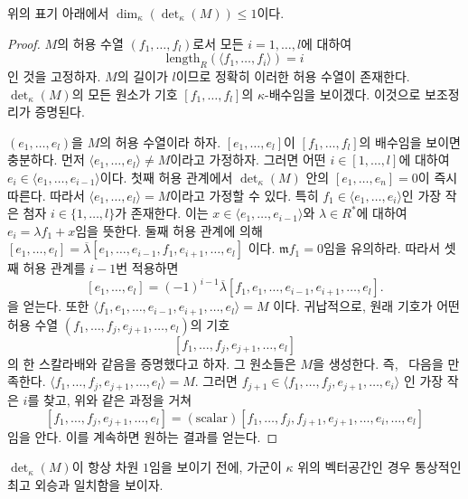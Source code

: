 \begin{lemma}
\label{lemma-dimension-at-most-one}
위의 표기 아래에서 $\dim_\kappa(\det_\kappa(M)) \leq 1$이다.
\end{lemma}

\begin{proof}
$M$의 허용 수열 $(f_1, \ldots, f_l)$로서 모든
$i = 1, \ldots, l$에 대하여
$$
\text{length}_R(\langle f_1, \ldots, f_i\rangle) = i
$$
인 것을 고정하자. $M$의 길이가 $l$이므로 정확히 이러한 허용 수열이
존재한다. $\det_\kappa(M)$의 모든 원소가 기호
$[f_1, \ldots, f_l]$의 $\kappa$-배수임을 보이겠다. 이것으로
보조정리가 증명된다.

\medskip\noindent
$(e_1, \ldots, e_l)$을 $M$의 허용 수열이라 하자.
$[e_1, \ldots, e_l]$이 $[f_1, \ldots, f_l]$의 배수임을 보이면
충분하다. 먼저
$\langle e_1, \ldots, e_l\rangle \not = M$이라고 가정하자.
그러면 어떤 $i \in [1, \ldots, l]$에 대하여
$e_i \in \langle e_1, \ldots, e_{i - 1}\rangle$이다. 첫째 허용
관계에서 $\det_\kappa(M)$ 안의
$[e_1, \ldots, e_n] = 0$이 즉시 따른다. 따라서
$\langle e_1, \ldots, e_l\rangle = M$이라고 가정할 수 있다.
특히 $f_1 \in \langle e_1, \ldots, e_i\rangle$인 가장 작은 첨자
$i \in \{1, \ldots, l\}$가 존재한다. 이는
$x \in \langle e_1, \ldots, e_{i - 1}\rangle$와
$\lambda \in R^*$에 대하여 $e_i = \lambda f_1 + x$임을 뜻한다.
둘째 허용 관계에 의해
$[e_1, \ldots, e_l] =
\overline{\lambda}[e_1, \ldots, e_{i - 1}, f_1, e_{i + 1}, \ldots, e_l]$
이다. $\mathfrak m f_1 = 0$임을 유의하라. 따라서 셋째 허용 관계를
$i - 1$번 적용하면
$$
[e_1, \ldots, e_l] =
(-1)^{i - 1}\overline{\lambda}
[f_1, e_1, \ldots, e_{i - 1}, e_{i + 1}, \ldots, e_l].
$$
을 얻는다. 또한
$ \langle f_1, e_1, \ldots, e_{i - 1}, e_{i + 1}, \ldots, e_l\rangle = M$
이다. 귀납적으로, 원래 기호가 어떤 허용 수열
$(f_1, \ldots, f_j, e_{j + 1}, \ldots, e_l)$의 기호
$$
[f_1, \ldots, f_j, e_{j + 1}, \ldots, e_l]
$$
의 한 스칼라배와 같음을 증명했다고 하자. 그 원소들은 $M$을
생성한다. 즉, \ 다음을 만족한다.
$\langle f_1, \ldots, f_j, e_{j + 1}, \ldots, e_l\rangle = M$.
그러면
$f_{j + 1} \in \langle f_1, \ldots, f_j, e_{j + 1}, \ldots, e_i\rangle$
인 가장 작은 $i$를 찾고, 위와 같은 과정을 거쳐
$$
[f_1, \ldots, f_j, e_{j + 1}, \ldots, e_l]
=
(\text{scalar}) [f_1, \ldots, f_j, f_{j + 1}, e_{j + 1},
\ldots, \hat{e_i}, \ldots, e_l]
$$
임을 안다. 이를 계속하면 원하는 결과를 얻는다.
\end{proof}

\noindent
$\det_\kappa(M)$이 항상 차원 $1$임을 보이기 전에, 가군이
$\kappa$ 위의 벡터공간인 경우 통상적인 최고 외승과 일치함을 보이자.

